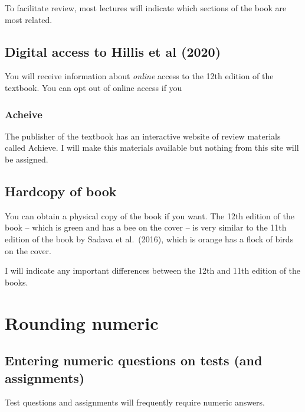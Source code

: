 \documentclass[
]{book}
\begin{document}
To facilitate review, most lectures will indicate which sections of the book are most related.

\hypertarget{digital-access-to-hillis-et-al-2020}{%
\section{Digital access to Hillis et al (2020)}\label{digital-access-to-hillis-et-al-2020}}

You will receive information about \emph{online} access to the 12th edition of the textbook. You can opt out of online access if you

\hypertarget{acheive-1}{%
\subsection{Acheive}\label{acheive-1}}

The publisher of the textbook has an interactive website of review materials called Achieve. I will make this materials available but nothing from this site will be assigned.

\hypertarget{hardcopy-of-book}{%
\section{Hardcopy of book}\label{hardcopy-of-book}}

You can obtain a physical copy of the book if you want. The 12th edition of the book -- which is green and has a bee on the cover -- is very similar to the 11th edition of the book by Sadava et al.~(2016), which is orange has a flock of birds on the cover.

I will indicate any important differences between the 12th and 11th edition of the books.

\hypertarget{rounding-numeric}{%
\chapter{Rounding numeric}\label{rounding-numeric}}

\hypertarget{entering-numeric-questions-on-tests-and-assignments}{%
\section{Entering numeric questions on tests (and assignments)}\label{entering-numeric-questions-on-tests-and-assignments}}

Test questions and assignments will frequently require numeric answers.
\end{document}
